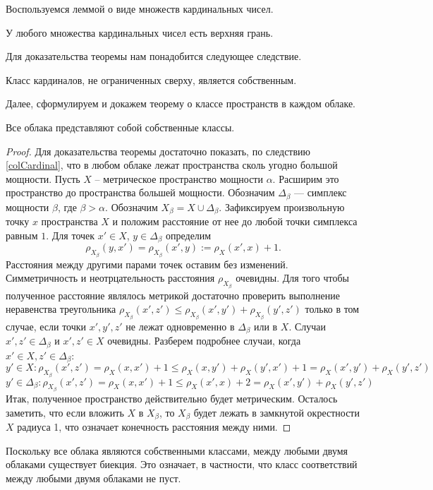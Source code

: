 \documentclass[11pt,twoside,draft
]{article}
\begin{document}
Воспользуемся леммой о виде множеств кардинальных чисел.
\begin{lemma}
  У любого множества кардинальных чисел есть верхняя грань.
\end{lemma}
Для доказательства теоремы нам понадобится следующее следствие.
\begin{corollary}
  Класс кардиналов, не ограниченных сверху, является собственным.
  \label{colCardinal}
\end{corollary}
Далее, сформулируем и докажем теорему о классе пространств в каждом облаке.
\begin{theorem} Все облака представляют собой собственные классы.
\end{theorem}
\begin{proof} Для доказательства теоремы достаточно показать, по
  следствию \ref{colCardinal}, что в любом
  облаке лежат пространства сколь угодно большой мощности.  Пусть $X$ --
  метрическое пространство мощности $\alpha$. Расширим это пространство до
  пространства большей мощности. Обозначим $\Delta_\beta$ --- симплекс мощности
  $\beta$, где $\beta > \alpha$. Обозначим $X_\beta = X \cup \Delta_\beta$.
  Зафиксируем произвольную точку $x$ пространства $X$ и положим
  расстояние от нее
  до любой точки симплекса равным $1$. Для точек $x' \in X$,
  $y \in \Delta_\beta$ определим
  $$\rho_{X_\beta}(y,x') = \rho_{X_\beta}(x',y) := \rho_X(x',x) + 1.$$
  Расстояния между другими парами точек оставим без изменений.
  Симметричность и неотрцательность расстояния $\rho_{X_{\beta}}$ очевидны.
  Для того чтобы
  полученное расстояние являлось метрикой достаточно проверить выполнение
  неравенства треугольника
  $\rho_{X_\beta}(x',z') \le \rho_{X_\beta}(x',y') +\rho_{X_\beta}(y',z')$
  только в том случае, если точки $x', y', z'$ не лежат одновременно в
  $\Delta_\beta$ или в $X$. Случаи $x', z' \in \Delta_\beta$ и $ x', z' \in X$
  очевидны. Разберем подробнее случаи, когда $x' \in X, z' \in \Delta_\beta$:
  $$ y' \in X: \rho_{X_\beta}(x', z') = \rho_X(x,x') + 1 \le
  \rho_X(x,y') + \rho_X(y',x') + 1 = \rho_X(x',y') + \rho_X(y',z')$$
  $$y' \in \Delta_\beta: \rho_{X_\beta}(x', z') = \rho_X(x,x') + 1
  \le \rho_X(x',x) + 2 = \rho_X(x',y') + \rho_X(y',z')$$
  Итак, полученное пространство действительно будет метрическим. Осталось
  заметить, что если вложить $X$ в $X_\beta$, то $X_\beta$ будет лежать в
  замкнутой окрестности $X$ радиуса 1, что означает конечность расстояния между
  ними.
\end{proof}

\begin{remark} Поскольку все облака являются собственными классами, между
  любыми двумя облаками существует биекция. Это означает, в
  частности, что класс соответствий между любыми двумя облаками не пуст.
\end{remark}
\end{document}
